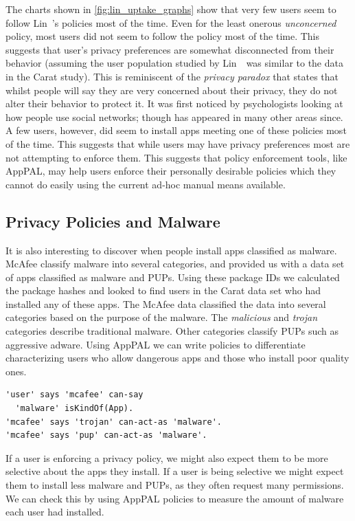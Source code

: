 \documentclass[thesis.tex]{subfiles}
\begin{document}
The charts shown in \autoref{fig:lin_uptake_graphs} show that very few
users seem to follow Lin~\etal's policies most of the
time. Even for the least onerous
\emph{unconcerned} policy, most users did not seem to follow the
policy most of the time.  This suggests that user's privacy preferences are somewhat disconnected from their behavior (assuming the user population
studied by Lin~\etal~was similar to the data in the Carat study).
This is reminiscent of
the \emph{privacy paradox} that states that whilst
people will say they are very concerned about their privacy, they do
not alter their behavior to protect it.  It was first noticed by
psychologists looking at how people use social networks; though has
appeared in many other areas since. 
A few users, however, did seem to install apps meeting one of these
policies most of the time.  This suggests that while users may have
privacy preferences most are not attempting to enforce them.  This
suggests that policy enforcement tools, like AppPAL, may help users
enforce their personally desirable policies which they cannot do
easily using the current ad-hoc manual means available.

\subsection{Privacy Policies and Malware}

It is also interesting to discover when people install apps classified
as malware.  McAfee classify malware into several categories, and
provided us with a data set of apps classified as malware and
\acp{PUP}. Using these package IDs we calculated the package hashes
and looked to find users in the Carat data set who had installed any of
these apps.  The McAfee data classified the data into several
categories based on the purpose of the malware.  The \emph{malicious}
and \emph{trojan} categories describe traditional malware.  Other
categories classify \acp{PUP} such as aggressive adware.  Using AppPAL
we can write policies to differentiate characterizing users who allow
dangerous apps and those who install poor quality ones.

\begin{lstlisting}
'user' says 'mcafee' can-say
  'malware' isKindOf(App).
'mcafee' says 'trojan' can-act-as 'malware'.
'mcafee' says 'pup' can-act-as 'malware'.
\end{lstlisting}

If a user is enforcing a privacy policy, we might also expect them to
be more selective about the apps they install.  If a user is being
selective we might expect them to install less malware and \acp{PUP},
as they often request many permissions. We can check this by using
AppPAL policies to measure the amount of malware each user had
installed.
\end{document}
